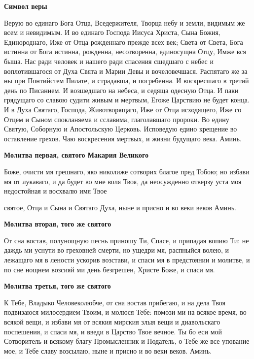  

\bfseries Символ веры\normalfont{}


   Верую во единаго Бога Отца, Вседержителя, Творца небу и земли,
видимым же всем и невидимым. И во единаго Господа Иисуса Христа, Сына
Божия, Единороднаго, Иже от Отца рожденнаго прежде всех век; Света от
Света, Бога истинна от Бога истинна, рожденна, несотворенна, единосущна
Отцу, Имже вся быша. Нас ради человек и нашего ради спасения сшедшаго с
небес и воплотившагося от Духа Свята и Марии Девы и вочеловечшася.
Распятаго же за ны при Понтийстем Пилате, и страдавша, и погребенна. И
воскресшаго в третий день по Писанием. И возшедшаго на небеса, и
седяща одесную Отца. И паки грядущаго со славою судити живым и
мертвым, Егоже Царствию не будет конца. И в Духа Святаго, Господа,
Животворящаго, Иже от Отца исходящего, Иже со Отцем и Сыном
спокланяема и сславима, глаголавшаго пророки. Во едину Святую,
Соборную и Апостольскую Церковь. Исповедую едино крещение во
оставление грехов. Чаю воскресения мертвых, и жизни будущаго века.
Аминь.



 

\bfseries Молитва первая, святого Макария Великого\normalfont{}


   Боже, очисти мя грешнаго, яко николиже сотворих благое пред
Тобою; но избави мя от лукаваго, и да будет во мне воля Твоя, да
неосужденно отверзу уста моя недостойная и восхвалю имя Твое

святое, Отца и Сына и Святаго Духа, ныне и присно и во веки веков
Аминь.



 

\bfseries  Молитва вторая, того же святого\normalfont{}


   От сна востав, полунощную песнь приношу Ти, Спасе, и припадая вопию
Ти: не даждь ми уснути во греховней смерти, но ущедри мя, распныйся
волею, и лежащаго мя в лености ускорив возстави, и спаси мя в предстоянии
и молитве, и по сне нощнем возсияй ми день безгрешен, Христе Боже, и
спаси мя.



 

\bfseries Молитва третья, того же святого\normalfont{}


   К Тебе, Владыко Человеколюбче, от сна востав прибегаю, и на дела Твоя
подвизаюся милосердием Твоим, и молюся Тебе: помози ми на всякое время,
во всякой вещи, и избави мя от всякия мирския злыя вещи и диавольскаго
поспешения, и спаси мя, и введи в Царство Твое вечное. Ты бо еси мой
Сотворитель и всякому благу Промысленник и Податель, о Тебе же все
упование мое, и Тебе славу возсылаю, ныне и присно и во веки веков.
Аминь.



